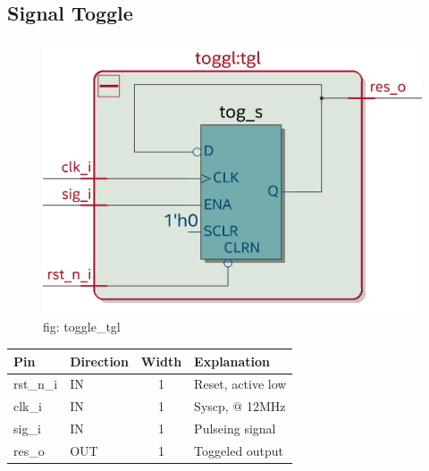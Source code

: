 \documentclass[12pt,a4 paper] {report}
\begin{document}
\subsection{Signal Toggle}
\begin{figure}[h]
	\centering	
	\includegraphics[scale=0.2]{../png/toggl_tgl.png}
	\newline
	fig: toggle\_tgl \\
\end{figure}
\begin{center}
	\begin{tabular}{| p{2cm} | p{2cm} | c| p{4cm} |}
	\hline
	Pin & Direction & Width & Explanation\\
	\hline	
	  rst\_n\_i & IN  & 1 &  Reset, active low\\
	  \hline
	clk\_i & IN  & 1 & Syscp, @ 12MHz \\
	\hline
	sig\_i & IN   & 1 &  Pulseing signal\\
	\hline
	res\_o  & OUT   & 1 & Toggeled output\\
	\hline
	\end{tabular}
\end{center}
\newpage
\end{document}
